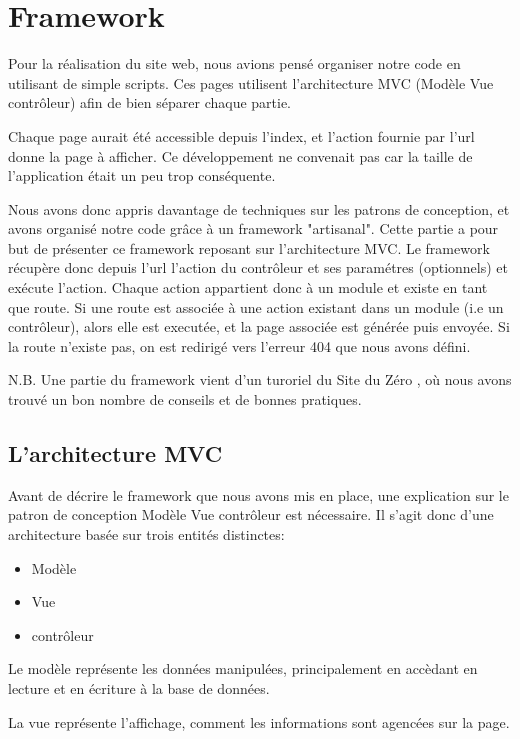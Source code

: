 
    \section{Framework}
Pour la réalisation du site web, nous avions pensé organiser notre code en utilisant de simple scripts.
Ces pages utilisent l'architecture MVC (Modèle Vue contrôleur) afin de bien séparer chaque partie.

Chaque page aurait été accessible depuis l'index, et l'action fournie par l'url donne la page à afficher.
Ce développement ne convenait pas car la taille de l'application était un peu trop conséquente.

Nous avons donc appris davantage de techniques sur les patrons de conception, et avons organisé notre code
grâce à un framework "artisanal". Cette partie a pour but de présenter ce framework reposant sur l'architecture MVC.
Le framework récupère donc depuis l'url l'action du contrôleur et ses paramétres (optionnels) et exécute l'action.
Chaque action appartient donc à un module et existe en tant que route. Si une route est associée à une action existant dans
un module (i.e un contrôleur), alors elle est executée, et la page associée est générée puis envoyée.
Si la route n'existe pas, on est redirigé vers l'erreur 404 que nous avons défini.

N.B. Une partie du framework vient d'un turoriel du Site du Zéro \cite{ref_framework_mvc}, 
où nous avons trouvé un bon nombre de conseils et de bonnes pratiques.

        \subsection{L'architecture MVC}
Avant de décrire le framework que nous avons mis en place, une explication sur le patron de conception Modèle Vue contrôleur
est nécessaire. Il s'agit donc d'une architecture basée sur trois entités distinctes:

    \begin{itemize}
    \item Modèle
    \item Vue
    \item contrôleur
    \end{itemize}

Le modèle représente les données manipulées, principalement en accèdant en lecture et en écriture à la base de données.

La vue représente l'affichage, comment les informations sont agencées sur la page.

